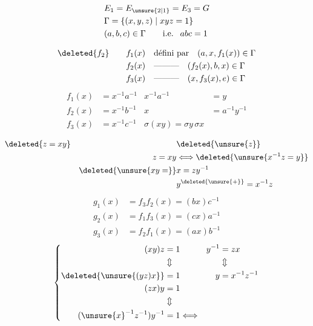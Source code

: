 \[
\begin{aligned}
&E_1=E_{\unsure{2|1}}=E_3=G\\
&\Gamma=\{(x,y,z)\mid xyz=1\}\\
&(a,b,c)\in\Gamma\qquad\text{i.e. }\ abc=1
\end{aligned}
\]

\[
\begin{aligned}
\deleted{f_2}\qquad f_1(x)&\quad\text{défini par}\quad (a,x,f_1(x))\in\Gamma\\
f_2(x)&\quad\text{---------}\quad(f_2(x),b,x)\in\Gamma\\
f_3(x)&\quad\text{---------}\quad(x,f_3(x),e)\in\Gamma
\end{aligned}
\]
\[
\begin{aligned}
f_1(x)&=x^{-1}a^{-1}&x^{-1}a^{-1}&=y\\
f_2(x)&=x^{-1}b^{-1}&x&=a^{-1}y^{-1}\\
f_3(x)&=x^{-1}c^{-1}&\boxed{\sigma(xy)=\sigma y\,\sigma x}
\end{aligned}
\]

\[
\begin{aligned}
&\deleted{z=xy}&&\deleted{\unsure{z}}\\
&&z=xy&\Longleftrightarrow\deleted{\unsure{x^{-1}z=y}}\\
&&\deleted{\unsure{xy=}}&x=zy^{-1}\\
&&&y^{\deleted{\unsure{+}}}=x^{-1}z
\end{aligned}
\]
\[
\begin{aligned}
g_1(x)&=f_3f_2(x)=(bx)c^{-1}\\
g_2(x)&=f_1f_3(x)=(cx)a^{-1}\\
g_3(x)&=f_2f_1(x)=(ax)b^{-1}
\end{aligned}
\]
\[
\left\{\begin{aligned}
(xy)z&=1 &y^{-1}&=zx\\
&\Updownarrow &&\Updownarrow\\
\deleted{\unsure{(yz)x}}&=1 &y&=x^{-1}z^{-1}\\
(zx)y&=1\\
&\Updownarrow\\
({\unsure{x}}^{-1}z^{-1})y^{-1}&=1\Longleftrightarrow
\end{aligned}\right.
\]

